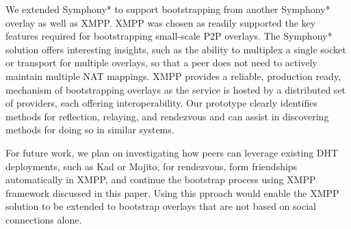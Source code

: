 \documentclass[conference]{IEEEtran}
\begin{document}
We extended Symphony* to support bootstrapping from another Symphony* overlay as well
as XMPP.  XMPP was chosen as readily supported the key features required for
bootstrapping small-scale P2P overlays.  The Symphony* solution offers interesting
insights, such as the ability to multiplex a single socket or transport for
multiple overlays, so that a peer does not need to actively maintain multiple
NAT mappings.  XMPP provides a reliable, production ready, mechanism of
bootstrapping overlays as the service is hosted by a distributed set of
providers, each offering interoperability.  Our prototype clearly identifies
methods for reflection, relaying, and rendezvous and can assist in discovering
methods for doing so in similar systems.

For future work, we plan on investigating how peers can leverage existing DHT
deployments, such as Kad or Mojito, for rendezvous, form friendships
automatically in XMPP, and continue the bootstrap process using XMPP framework
discussed in this paper.  Using this pproach would enable the XMPP solution to
be extended to bootstrap overlays that are not based on social connections
alone.




\suppressfloats
\end{document}
